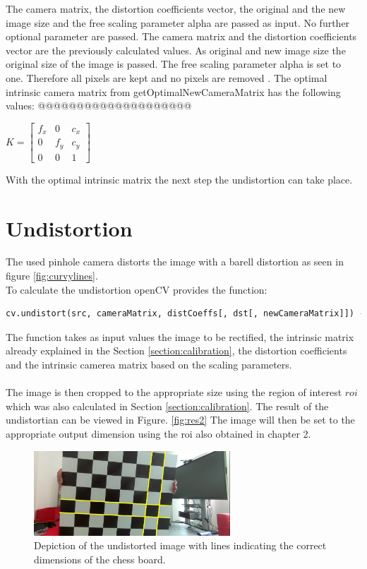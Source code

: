 \documentclass[twocolumn,10pt]{asme2ej}
\begin{document}
The camera matrix, the distortion coefficients vector, the original and the new image size and the free scaling parameter alpha are passed as input. No further optional parameter are passed. The camera matrix and the distortion coefficients vector are the previously calculated values. As original and new image size the original size of the image is passed. The free scaling parameter alpha is set to one. Therefore all pixels are kept and no pixels are removed \cite{opencv_calibrationtutorial}.
The optimal intrinsic camera matrix from getOptimalNewCameraMatrix has the following values:
@@@@@@@@@@@@@@@@@@@@
\begin{center}
    $K = \begin{bmatrix}
   f_x & 0 & c_x \\
   0 & f_y & c_y \\
   0 & 0 & 1
\end{bmatrix}
   $
    \label{eq_optintrinsicmatrix}
\end{center}
With the optimal intrinsic matrix the next step the undistortion can take place.

\section{Undistortion}
\label{section:undistortion}
\noindent
The used pinhole camera distorts the image with a barell distortion 
as seen in figure \ref{fig:curvylines}.
\\
\noindent To calculate the undistortion openCV provides the function:
\begin{lstlisting}[language=Python]
    cv.undistort(src, cameraMatrix, distCoeffs[, dst[, newCameraMatrix]]) -> dst
\end{lstlisting}
The function takes as input values the image to be rectified, the intrinsic matrix already explained in the Section \ref{section:calibration}, 
the distortion coefficients and the intrinsic camerea matrix based on the scaling parameters.
\\\\
The image is then cropped to the appropriate size using the region of 
interest \(roi\) which was also calculated in Section \ref{section:calibration}.
The result of the undistortian can be viewed in Figure. \ref{fig:res2}
The image will then be set to the appropriate output dimension using the roi also obtained in chapter 2.
\begin{figure}[H]
    \centerline{\includegraphics[width=2.9in]{output/straight_lines.PNG}}
    \caption{Depiction of the undistorted image with lines indicating the correct dimensions of the chess board.}
    \label{fig:straightlines}
\end{figure}
\end{document}
